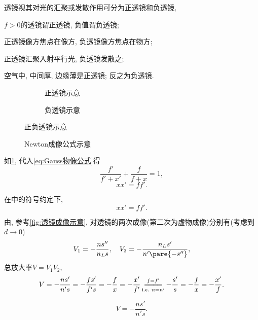 \documentclass{ctexart}
\DeclareMathOperator*{\commentequals}{=\joinrel=\joinrel=\joinrel=}
\begin{document}
透镜视其对光的汇聚或发散作用可分为正透镜和负透镜,
\begin{cenum}
    \item $f>0$的透镜谓正透镜, 负值谓负透镜;
    \item 正透镜像方焦点在像方, 负透镜像方焦点在物方;
    \item 正透镜汇聚入射平行光, 负透镜发散之;
    \item {\color{red}空气中}, 中间厚, 边缘薄是正透镜; 反之为负透镜.
\end{cenum}
\begin{figure}[ht]
    \centering
    \begin{subfigure}{.45\textwidth}
        \centering
        \caption{正透镜示意}
    \end{subfigure}
    \begin{subfigure}{.45\textwidth}
        \centering
        \caption{负透镜示意}
    \end{subfigure}
    \caption{正负透镜示意}
\end{figure}
\begin{figure}[ht]
    \centering
    \caption{Newton成像公式示意}
    \label{fig:Newton成像公式示意}
\end{figure}
如\cref{fig:Newton成像公式示意}, 代入\eqref{eq:Gauss物像公式}得
\[ \frac{f'}{f'+x'} + \frac{f}{f+x} = 1, \]
\[ xx' = ff'. \]
\begin{finale}
    \begin{theorem}[Newton成像公式]
        在中的符号约定下,
        \begin{equation}
            \label{eq:Newton成像公式}
            xx' = ff'. 
        \end{equation}
    \end{theorem}
\end{finale}
由, 参考\cref{fig:透镜成像示意}, 对透镜的两次成像(第二次为虚物成像)分别有(考虑到$d\rightarrow 0$)
\[ V_1 = -\frac{ns''}{n_L s},\quad V_2 = -\frac{n_Ls'}{n'\pare{-s''}}, \]
总放大率$V = V_1V_2$,
\begin{equation}
    \label{eq:FactorMagnification}
    V = -\frac{ns'}{n's} = -\frac{fs'}{f's} = -\frac{f}{x} = -\frac{x'}{f'} \commentequals^{f=f'}_{\text{i.e. }n=n'} -\frac{s'}{s} = -\frac{f}{x} = -\frac{x'}{f}. 
\end{equation}
\begin{finale}
    \begin{theorem}[透镜放大率公式]
        \[ V = -\frac{ns'}{n's}. \]
    \end{theorem}
\end{finale}
\end{document}
